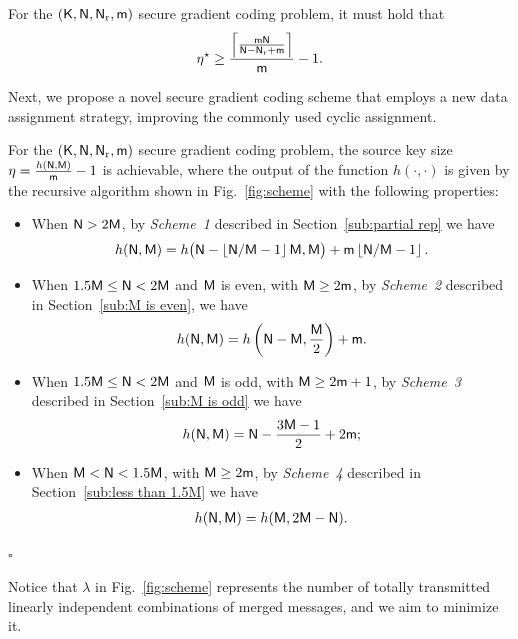 \documentclass[conference,letterpaper]{IEEEtran}
\begin{document}
\begin{cor}
\label{cor:converse cor}
For the $({\sf K},{\sf N},{\sf N}_{\rm r}, {\sf m})$ secure gradient coding problem,
 it must hold that
\begin{align}
\eta^{\star} \geq \frac{\left\lceil  \frac{{\sf m}{\sf N}}{{\sf N}-{\sf N}_{\rm r}+{\sf m}} \right\rceil}{{\sf m}} -1. \label{eq:converse cor}
\end{align}
\end{cor} 
      


Next, we propose a novel secure gradient coding scheme that employs a new data assignment strategy, improving the commonly used cyclic  assignment.

\begin{thm}
\label{thm:main achievable scheme}
For the $({\sf K},{\sf N},{\sf N}_{\rm r}, {\sf m})$ secure gradient coding problem, the source key size  $\eta=  \frac{ h({\sf N},{\sf M})}{{\sf m}}-1$ is achievable, where the output of the function \( h(\cdot, \cdot) \) is given by the recursive algorithm shown in Fig.~\ref{fig:scheme} with the following properties:
 \begin{itemize}

 \item When  ${\sf N} > 2{\sf M}$,  by {\it Scheme~1} described in Section~\ref{sub:partial rep} we have  
\begin{align}
h({\sf N},{\sf M})=h\big({\sf N}-\left\lfloor {\sf N}/{\sf M}-1\right\rfloor {\sf M},{\sf M}\big)+ {\sf m}\left\lfloor {\sf N}/{\sf M} -1\right\rfloor  . \label{eq:from partial rep}
\end{align} 
\item When $1.5 {\sf M} \leq {\sf N} < 2 {\sf M}$ and ${\sf M}$ is even, with ${\sf M} \geq 2{\sf m}$,
by {\it Scheme~2} described in Section~\ref{sub:M is even}, we have  
\begin{align}
 h({\sf N}, {\sf M}) = h\left({\sf N} - {\sf M}, \frac{{\sf M}}{2}\right) + {\sf m}. \label{eq:M is even}
\end{align}

 \item When $1.5 {\sf M} \leq  {\sf N} < 2 {\sf M}$ and ${\sf M}$ is odd, with ${\sf M} \geq 2{\sf m}+1$, by  {\it Scheme~3} described in Section~\ref{sub:M is odd} we have  
 \begin{align}
 h({\sf N},{\sf M})=   {\sf N}-\frac{3{\sf M}-1}{2}+2 {\sf m}; \label{eq:M is odd}
 \end{align}
 \item When ${\sf M}< {\sf N} <  1.5 {\sf M}$, with ${\sf M} \geq 2{\sf m}$, by  {\it Scheme~4} described in Section~\ref{sub:less than 1.5M}  we have  
\begin{align}
h({\sf N},{\sf M})=h({\sf M},2{\sf M}-{\sf N}). \label{eq:less than 1.5M}
\end{align} 
  \end{itemize}
    \hfill $\square$ 
 \end{thm} 
Notice that $\lambda$ in Fig.~\ref{fig:scheme} represents the number of totally transmitted linearly independent combinations of merged messages, and we aim to minimize it.
 
\end{document}
